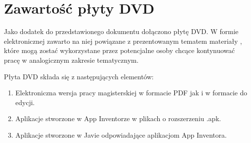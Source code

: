 \chapter{Zawartość płyty DVD}

Jako dodatek do przedstawionego  dokumentu dołączono płytę DVD. W formie elektronicznej zawarto na niej powiązane z prezentowanym tematem materiały , które mogą zostać wykorzystane przez potencjalne osoby chcące kontynuować pracę w analogicznym zakresie tematycznym. 

Płyta DVD składa się z następujących elementów:
\begin{enumerate}
\item Elektroniczna wersja pracy magisterskiej w formacie PDF jak i w formacie do edycji.
\item Aplikacje stworzone w App Inventorze w plikach o rozszerzeniu .apk.
\item Aplikacje stworzone w Javie odpowiadające aplikacjom App Inventora.
\end{enumerate}

